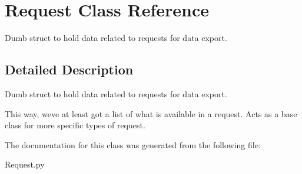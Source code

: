 \hypertarget{class_request}{}\section{Request Class Reference}
\label{class_request}


Dumb struct to hold data related to requests for data export.  




\subsection{Detailed Description}
Dumb struct to hold data related to requests for data export. 

This way, we\textquotesingle{}ve at least got a list of what is available in a request. Acts as a base class for more specific types of request. 

The documentation for this class was generated from the following file\+:\begin{DoxyCompactItemize}
\item 
Request.\+py\end{DoxyCompactItemize}
